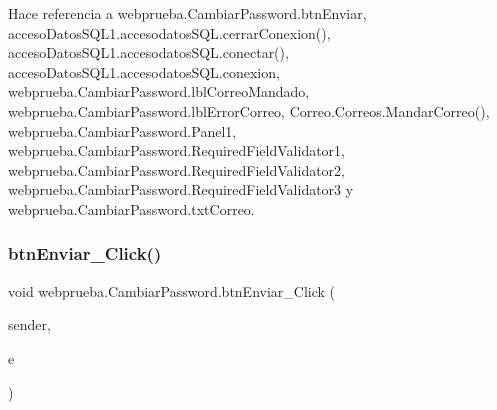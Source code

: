 \begin{DoxyCode}{0}

\end{DoxyCode}


Hace referencia a webprueba.\+Cambiar\+Password.\+btn\+Enviar, acceso\+Datos\+S\+Q\+L1.\+accesodatos\+S\+Q\+L.\+cerrar\+Conexion(), acceso\+Datos\+S\+Q\+L1.\+accesodatos\+S\+Q\+L.\+conectar(), acceso\+Datos\+S\+Q\+L1.\+accesodatos\+S\+Q\+L.\+conexion, webprueba.\+Cambiar\+Password.\+lbl\+Correo\+Mandado, webprueba.\+Cambiar\+Password.\+lbl\+Error\+Correo, Correo.\+Correos.\+Mandar\+Correo(), webprueba.\+Cambiar\+Password.\+Panel1, webprueba.\+Cambiar\+Password.\+Required\+Field\+Validator1, webprueba.\+Cambiar\+Password.\+Required\+Field\+Validator2, webprueba.\+Cambiar\+Password.\+Required\+Field\+Validator3 y webprueba.\+Cambiar\+Password.\+txt\+Correo.

\mbox{\label{classwebprueba_1_1_cambiar_password_abaaa04899f2215cc960555112b9f13f1}} 
\subsubsection{\texorpdfstring{btnEnviar\_Click()}{btnEnviar\_Click()}\hspace{0.1cm}{\footnotesize\ttfamily [1/2]}}
{\footnotesize\ttfamily void webprueba.\+Cambiar\+Password.\+btn\+Enviar\+\_\+\+Click (\begin{DoxyParamCaption}\item[{object}]{sender,  }\item[{Event\+Args}]{e }\end{DoxyParamCaption})\hspace{0.3cm}{\ttfamily [protected]}}



